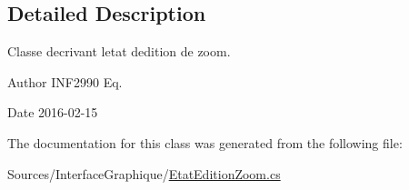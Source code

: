 \subsection{Detailed Description}
Classe decrivant l\textquotesingle{}etat d\textquotesingle{}edition de zoom. 

\begin{DoxyAuthor}{Author}
I\+N\+F2990 Eq. 
\end{DoxyAuthor}
\begin{DoxyDate}{Date}
2016-\/02-\/15 
\end{DoxyDate}


The documentation for this class was generated from the following file\+:\begin{DoxyCompactItemize}
\item 
Sources/\+Interface\+Graphique/\hyperlink{_etat_edition_zoom_8cs}{Etat\+Edition\+Zoom.\+cs}\end{DoxyCompactItemize}
